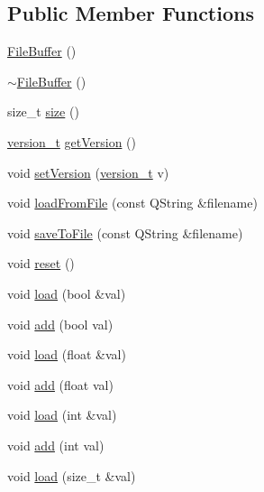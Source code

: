 \subsection*{Public Member Functions}
\begin{DoxyCompactItemize}
\item 
\hyperlink{classShipCAD_1_1FileBuffer_ab243cfcb8a68ce791103594e974ee9ba}{File\-Buffer} ()
\item 
\hyperlink{classShipCAD_1_1FileBuffer_ac92d5e7d145ea18fc6a3a6a18c788ebb}{$\sim$\-File\-Buffer} ()
\item 
size\-\_\-t \hyperlink{classShipCAD_1_1FileBuffer_a51dc1007457d999ce374afd6a6ae29f8}{size} ()
\item 
\hyperlink{namespaceShipCAD_af3a6fa23a7318acbda7b0066b53d694f}{version\-\_\-t} \hyperlink{classShipCAD_1_1FileBuffer_a06f87b30f5fd091cc5c270964ea16770}{get\-Version} ()
\item 
void \hyperlink{classShipCAD_1_1FileBuffer_a8769c7659ea5c015e004529517cf8fcb}{set\-Version} (\hyperlink{namespaceShipCAD_af3a6fa23a7318acbda7b0066b53d694f}{version\-\_\-t} v)
\item 
void \hyperlink{classShipCAD_1_1FileBuffer_a7d5d6ac5aa85545999186f4745a77093}{load\-From\-File} (const Q\-String \&filename)
\item 
void \hyperlink{classShipCAD_1_1FileBuffer_a175d7a153228b5cba5db062a2afd5026}{save\-To\-File} (const Q\-String \&filename)
\item 
void \hyperlink{classShipCAD_1_1FileBuffer_af59c26297994b38aabc4bc678d04c246}{reset} ()
\item 
void \hyperlink{classShipCAD_1_1FileBuffer_ad1aebcc97e364569934c66eec5a87485}{load} (bool \&val)
\item 
void \hyperlink{classShipCAD_1_1FileBuffer_a7cb4395eae7ffa405290c3bed9890bee}{add} (bool val)
\item 
void \hyperlink{classShipCAD_1_1FileBuffer_a525306d68a017ef67ec13c3e8901a8ff}{load} (float \&val)
\item 
void \hyperlink{classShipCAD_1_1FileBuffer_a7909794ac33ad5f695bb670940db99ba}{add} (float val)
\item 
void \hyperlink{classShipCAD_1_1FileBuffer_a557fd80268788313b97149797dc710f8}{load} (int \&val)
\item 
void \hyperlink{classShipCAD_1_1FileBuffer_a475ac244828b4ec9bf6e19f1d65e9443}{add} (int val)
\item 
void \hyperlink{classShipCAD_1_1FileBuffer_a10729a5ec1869b76101e52db5a0e3ea7}{load} (size\-\_\-t \&val)

\end{DoxyCompactItemize}
